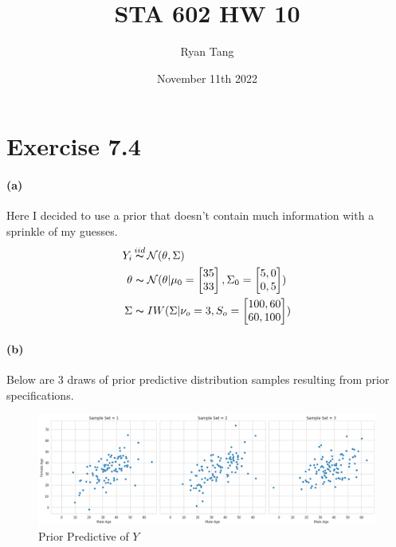 \documentclass[11pt, letterpaper]{article}
\author{Ryan Tang}
\title{STA 602 HW 10}
\date{November 11th 2022}
\begin{document}
\maketitle

\section{Exercise 7.4}
\paragraph{(a)}
Here I decided to use a prior that doesn't contain much information with a sprinkle of my guesses.
\begin{align*}
    Y_i &\mathop{\thicksim}^{iid} \mathcal{N}(\theta, \Sigma) \\
    \theta &\thicksim \mathcal{N}(\theta|
        \mu_0=\begin{bmatrix}35\\33\end{bmatrix},
        \Sigma_0=\begin{bmatrix}5,0\\0,5\end{bmatrix}
    ) \\
    \Sigma &\thicksim IW(\Sigma|\nu_o = 3, S_o =\begin{bmatrix}100,60\\60,100\end{bmatrix})
\end{align*}

\paragraph{(b)}
Below are 3 draws of prior predictive distribution samples resulting from prior specifications.
\begin{figure}[!h]
  \centering
  \includegraphics[width=1.0\textwidth]{1.a.png}
  \captionsetup{justification=centering}
  \caption{Prior Predictive of $Y$}
\end{figure}
\end{document}
